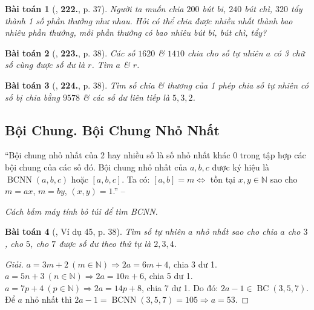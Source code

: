 \documentclass{article}
\numberwithin{equation}{section}
\newtheorem{baitoan}{Bài toán}[section]
\begin{document}
\begin{baitoan}[\cite{Binh_Toan_6_tap_1}, \textbf{222.}, p. 37]
	Người ta muốn chia $200$ bút bi, $240$ bút chì, $320$ tẩy thành 1 số phần thưởng như nhau. Hỏi có thể chia được nhiều nhất thành bao nhiêu phần thưởng, mỗi phần thưởng có bao nhiêu bút bi, bút chì, tẩy?
\end{baitoan}

\begin{baitoan}[\cite{Binh_Toan_6_tap_1}, \textbf{223.}, p. 38]
	Các số $1620$ \& $1410$ chia cho số tự nhiên $a$ có 3 chữ số cùng được số dư là $r$. Tìm $a$ \& $r$.
\end{baitoan}

\begin{baitoan}[\cite{Binh_Toan_6_tap_1}, \textbf{224.}, p. 38]
	Tìm số chia \& thương của 1 phép chia số tự nhiên có số bị chia bằng $9578$ \& các số dư liên tiếp là $5,3,2$.
\end{baitoan}


\subsection{Bội Chung. Bội Chung Nhỏ Nhất}
``Bội chung nhỏ nhất của 2 hay nhiều số là số nhỏ nhất khác $0$ trong tập hợp các bội chung của các số đó. Bội chung nhỏ nhất của $a,b,c$ được ký hiệu là $\operatorname{BCNN}(a,b,c)$ hoặc $[a,b,c]$. Ta có: $[a,b] = m\Leftrightarrow$ tồn tại $x,y\in\mathbb{N}$ sao cho $m = ax$, $m = by$, $(x,y) = 1$.'' -- \cite[\S10, p. 38]{Binh_Toan_6_tap_1}

\textit{Cách bấm máy tính bỏ túi để tìm BCNN.}

\begin{baitoan}[\cite{Binh_Toan_6_tap_1}, Ví dụ 45, p. 38]
	Tìm số tự nhiên $a$ nhỏ nhất sao cho chia $a$ cho $3$, cho $5$, cho $7$ được số dư theo thứ tự là $2,3,4$.
\end{baitoan}

\begin{proof}[Giải]
	$a = 3m + 2\ (m\in\mathbb{N})\Rightarrow 2a = 6m + 4$, chia 3 dư 1. $a = 5n + 3\ (n\in\mathbb{N})\Rightarrow 2a = 10n + 6$, chia 5 dư 1. $a = 7p + 4\ (p\in\mathbb{N})\Rightarrow 2a = 14p + 8$, chia 7 dư 1. Do đó: $2a - 1\in\operatorname{BC}(3,5,7)$. Để $a$ nhỏ nhất thì $2a - 1 = \operatorname{BCNN}(3,5,7) = 105\Rightarrow a = 53$.
\end{proof}
\end{document}
